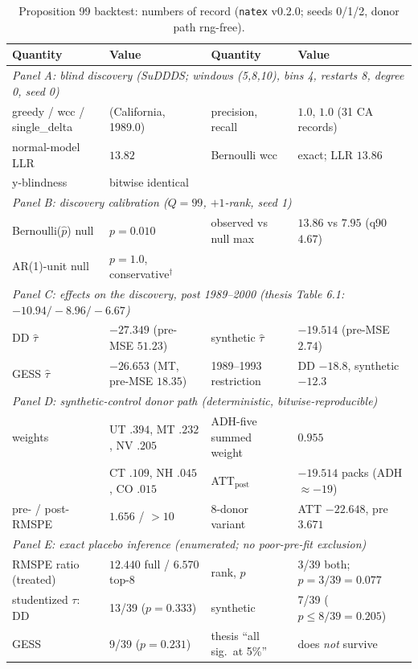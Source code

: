 \documentclass[11pt]{article}
\newcommand{\natex}{\texttt{natex}}
\begin{document}
\begin{table}[t]
\centering
\scriptsize
\caption{Proposition 99 backtest: numbers of record (\natex{} v0.2.0; seeds
0/1/2, donor path rng-free).}
\label{tab:main}
\setlength{\tabcolsep}{4pt}
\begin{tabular}{llll}
\toprule
Quantity & Value & Quantity & Value \\
\midrule
\multicolumn{4}{l}{\emph{Panel A: blind discovery (SuDDDS; windows (5,8,10), bins 4, restarts 8, degree 0, seed 0)}}\\
greedy / wcc / single\_delta & (California, 1989.0) & precision, recall & $1.0$, $1.0$ (31 CA records) \\
normal-model LLR & $13.82$ & Bernoulli wcc & exact; LLR $13.86$ \\
y-blindness & bitwise identical & & \\
\midrule
\multicolumn{4}{l}{\emph{Panel B: discovery calibration ($Q = 99$, $+1$-rank, seed 1)}}\\
Bernoulli($\hat p$) null & $p = 0.010$ & observed vs null max & $13.86$ vs $7.95$ (q90 $4.67$) \\
AR(1)-unit null & $p = 1.0$, conservative$^{\dagger}$ & & \\
\midrule
\multicolumn{4}{l}{\emph{Panel C: effects on the discovery, post 1989--2000 (thesis Table 6.1: $-10.94/-8.96/-6.67$)}}\\
DD $\hat\tau$ & $-27.349$ (pre-MSE $51.23$) & synthetic $\hat\tau$ & $-19.514$ (pre-MSE $2.74$) \\
GESS $\hat\tau$ & $-26.653$ (MT, pre-MSE $18.35$) & 1989--1993 restriction & DD $-18.8$, synthetic $-12.3$ \\
\midrule
\multicolumn{4}{l}{\emph{Panel D: synthetic-control donor path (deterministic, bitwise-reproducible)}}\\
weights & UT $.394$, MT $.232$, NV $.205$ & ADH-five summed weight & $0.955$ \\
 & CT $.109$, NH $.045$, CO $.015$ & ATT$_{\text{post}}$ & $-19.514$ packs (ADH $\approx -19$) \\
pre- / post-RMSPE & $1.656$ / $> 10$ & 8-donor variant & ATT $-22.648$, pre $3.671$ \\
\midrule
\multicolumn{4}{l}{\emph{Panel E: exact placebo inference (enumerated; no poor-pre-fit exclusion)}}\\
RMSPE ratio (treated) & $12.440$ full / $6.570$ top-8 & rank, $p$ & 3/39 both; $p = 3/39 = 0.077$ \\
studentized $\tau$: DD & 13/39 ($p = 0.333$) & synthetic & 7/39 ($p \leq 8/39 = 0.205$) \\
GESS & 9/39 ($p = 0.231$) & thesis ``all sig.\ at 5\%'' & does \emph{not} survive \\
\bottomrule
\end{tabular}


\end{table}
\end{document}
